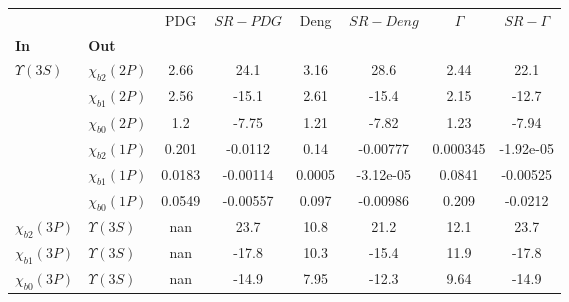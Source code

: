 \begin{tabular}{l|l|c|c|c|c|c|c}
\toprule
                &                &    PDG & $SR-PDG$ &   Deng & $SR-Deng$ &  $\Gamma$ & $SR-\Gamma$ \\
\textbf{In} & \textbf{Out} &        &          &        &           &           &             \\
\midrule
\textbf{$\Upsilon(3S)$} & \textbf{$\chi_{b2}(2P)$} &   2.66 &     24.1 &   3.16 &      28.6 &      2.44 &        22.1 \\
                & \textbf{$\chi_{b1}(2P)$} &   2.56 &    -15.1 &   2.61 &     -15.4 &      2.15 &       -12.7 \\
                & \textbf{$\chi_{b0}(2P)$} &    1.2 &    -7.75 &   1.21 &     -7.82 &      1.23 &       -7.94 \\
                & \textbf{$\chi_{b2}(1P)$} &  0.201 &  -0.0112 &   0.14 &  -0.00777 &  0.000345 &   -1.92e-05 \\
                & \textbf{$\chi_{b1}(1P)$} & 0.0183 & -0.00114 & 0.0005 & -3.12e-05 &    0.0841 &    -0.00525 \\
                & \textbf{$\chi_{b0}(1P)$} & 0.0549 & -0.00557 &  0.097 &  -0.00986 &     0.209 &     -0.0212 \\
\textbf{$\chi_{b2}(3P)$} & \textbf{$\Upsilon(3S)$} &    nan &     23.7 &   10.8 &      21.2 &      12.1 &        23.7 \\
\textbf{$\chi_{b1}(3P)$} & \textbf{$\Upsilon(3S)$} &    nan &    -17.8 &   10.3 &     -15.4 &      11.9 &       -17.8 \\
\textbf{$\chi_{b0}(3P)$} & \textbf{$\Upsilon(3S)$} &    nan &    -14.9 &   7.95 &     -12.3 &      9.64 &       -14.9 \\
\bottomrule
\end{tabular}
